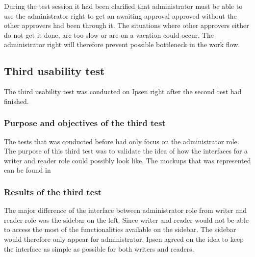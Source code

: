 During the test session it had been clarified that administrator must be able to use the administrator right to get an awaiting approval approved without the other approvers had been through it.
The situations where other approvers either do not get it done, are too slow or are on a vacation could occur. 
The administrator right will therefore prevent possible bottleneck in the work flow.



\subsection{Third usability test}\label{thirdtest}
The third usability test was conducted on Ipsen right after the second test had finished. 

\subsubsection*{Purpose and objectives of the third test}
The tests that was conducted before had only focus on the administrator role.
The purpose of this third test was to validate the idea of how the interfaces for a writer and reader role could possibly look like. 
The mockups that was represented can be found in  %

\subsubsection*{Results of the third test}
The major difference of the interface between administrator role from writer and reader role was the sidebar on the left.
Since writer and reader would not be able to access the most of the functionalities available on the sidebar.
The sidebar would therefore only appear for administrator. 
Ipsen agreed on the idea to keep the interface as simple as possible for both writers and readers. 

